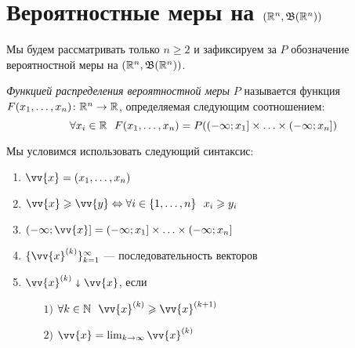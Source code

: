 \section{Вероятностные меры на $(\mathbb{R}^n, \mathfrak{B}(\mathbb{R}^n))$}

\begin{note}
	Мы будем рассматривать только $n \ge 2$ и зафиксируем за $P$ обозначение вероятностной меры на $(\mathbb{R}^n, \mathfrak{B}(\mathbb{R}^n))$.
\end{note}

\begin{definition}
	\textit{Функцией распределения вероятностной меры} $P$ называется функция $F(x_1, \ldots, x_n) \colon \mathbb{R}^n \to \mathbb{R}$, определяемая следующим соотношением:
	\[
		\forall x_i \in \mathbb{R}\ \ F(x_1, \ldots, x_n) = P(\left(-\infty; x_1\right] \times \ldots \times \left(-\infty; x_n\right])
	\]
\end{definition}

\begin{designation}
	Мы условимся использовать следующий синтаксис:
	\begin{enumerate}
		\item \(\vv{x} = (x_1, \ldots, x_n)\)
		
		\item \(\vv{x} \ge \vv{y} \Lra \forall i \in \range{1}{n}\ \ x_i \ge y_i\)
		
		\item \(\rsi{-\infty; \vv{x}} = \rsi{-\infty; x_1} \times \ldots \times \rsi{-\infty; x_n}\)
		
		\item \(\{\vv{x}^{(k)}\}_{k = 1}^\infty\) --- последовательность векторов
		
		\item \(\vv{x}^{(k)} \sda \vv{x}\), если
		\begin{enumerate}
			\item[$1)$] \(\forall k \in \N\ \ \vv{x}^{(k)} \ge \vv{x}^{(k + 1)}\)
			
			\item[$2)$] \(\vv{x} = \lim_{k \to \infty} \vv{x}^{(k)}\)
		\end{enumerate}
	\end{enumerate}
\end{designation}

